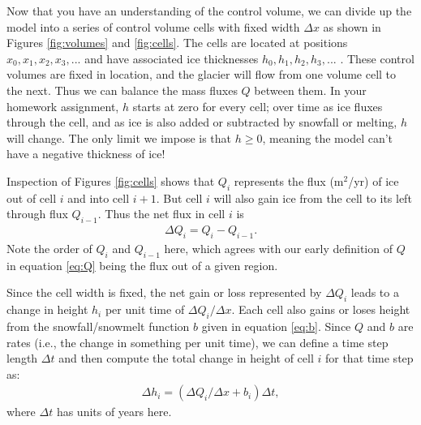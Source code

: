 \documentclass[11pt, oneside]{article}   	%
\begin{document}
Now that you have an understanding of the control volume, we can divide up the model into a series of control volume cells with fixed width $\Delta x$ as shown in Figures \ref{fig:volumes} and \ref{fig:cells}. The cells are located at positions $x_0,x_1,x_2,x_3,...$ and have associated ice thicknesses $h_0,h_1,h_2,h_3,...$ . These control volumes are fixed in location, and the glacier will flow from one volume cell to the next.  Thus we can balance the mass fluxes $Q$ between them.  In your homework assignment,  $h$ starts at zero for every cell; over time as ice fluxes through the cell, and as ice is also added or subtracted by snowfall or melting, $h$ will change. The only limit we impose is that $h\ge 0$, meaning the model can't have a negative thickness of ice! 

Inspection of Figures \ref{fig:cells} shows that $Q_i$ represents the flux (m$^2$/yr) of ice out of cell $i$ and into cell $i+1$.  But cell $i$ will also gain ice from the cell to its left through flux $Q_{i-1}$. Thus the net flux in cell $i$ is 
\begin{eqnarray}
	\Delta Q_i =  Q_i - Q_{i-1}.
	\label{eq:deltaQ}
\end{eqnarray}
Note the order of $Q_i$ and  $Q_{i-1}$ here, which agrees with our early definition of $Q$ in equation \ref{eq:Q} being the flux out of a given region.

Since the cell width is fixed, the net gain or loss represented by $\Delta Q_i $ leads to a change in height $h_i$ per unit time of $\Delta Q_i/\Delta x$. Each cell also gains or loses height from the snowfall/snowmelt  function $b$ given in equation \ref{eq:b}.    Since $Q$ and $b$ are rates (i.e., the change in something per unit time), we can define a time step length $\Delta t$ and then compute the total change in height of cell $i$ for that time step as:
\begin{eqnarray}
	\Delta h_i = (\Delta Q_i/\Delta x + b_i )\Delta t,
	\label{eq:h_update}
\end{eqnarray}
where $\Delta t$ has units of years here.

\end{document}
